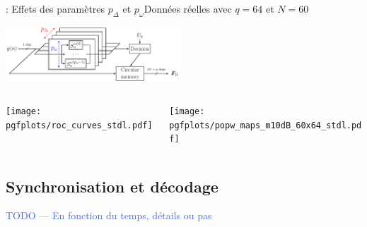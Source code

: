 \documentclass[../main.tex]{subfiles}
\begin{document}
\begin{frame}{\subsecname : {Effets des paramètres $p_\Delta$ et $p_\omega$}}{Données réelles avec $q = 64$ et $N = 60$}
  \begin{overlayarea}{\linewidth}{.15\textheight} \vspace {-1.2cm}
    \hfill \includegraphics[width=6.5cm, height=.75\textheight, keepaspectratio=true]{figures/tikzpicture/funct_view_detection_stdl.pdf}
  \end{overlayarea}
  \begin{columns}
    \begin{column}{.65\linewidth}
      \begin{overlayarea}{\linewidth}{.75\textheight} \vspace {-.5cm}
        \texttt{[image: pgfplots/roc\_curves\_stdl.pdf]}
      \end{overlayarea}
    \end{column}
    \begin{column}{.35\linewidth} \vspace {-.5cm}
      \texttt{[image: pgfplots/popw\_maps\_m10dB\_60x64\_stdl.pdf]}
    \end{column}
  \end{columns}
\end{frame}

\subsection{Synchronisation et décodage}

\begin{frame}{\subsecname}
  \begin{center}
    \textcolor{RoyalBlue}{TODO --- En fonction du temps, détails ou pas}
  \end{center}
\end{frame}


\end{document}
